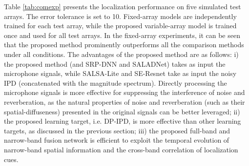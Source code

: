 \documentclass[lettersize,journal]{IEEEtran}
\begin{document}
Table \ref{tab:comexp} presents the localization performance on five simulated test arrays. The error tolerance is set to 10\degree. Fixed-array models are independently trained for each test array, while the proposed variable-array model is trained once and used for all test arrays.  
In the fixed-array experiments, it can be seen that the proposed method prominently outperforms all the comparison methods under all conditions. The advantages of the proposed method are as follows: i) the proposed method (and SRP-DNN and SALADNet) takes as input the microphone signals, while SALSA-Lite and SE-Resnet take as input the noisy IPD (concatenated with the magnitude spectrum). Directly processing the microphone signals is more effective for suppressing the interference of noise and reverberation, as the natural properties of noise and reverberation (such as their spatial-diffuseness) presented in the original signals can be better leveraged; ii) the proposed learning target, i.e. DP-IPD, is more effective than other learning targets, as discussed in the previous section; iii) the proposed full-band and narrow-band fusion network is efficient to exploit the temporal evolution of narrow-band spatial information and the cross-band correlation of localization cues. 

\end{document}
